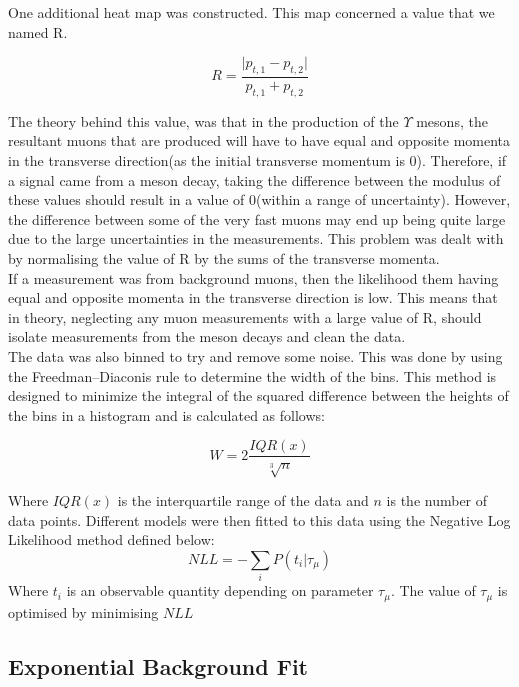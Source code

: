 \documentclass[A4sheet,12pt]{article}
\begin{document}
One additional heat map was constructed. This map concerned a value that we named R.

\begin{equation}
    R = \frac{\lvert p_{t, 1} - p_{t, 2}\rvert}{p_{t, 1} + p_{t, 2}}
\end{equation}

The theory behind this value, was that in the production of the $\Upsilon$ mesons, the resultant muons that are produced will have to have equal and opposite momenta in the transverse direction(as the initial transverse momentum is 0). Therefore, if a signal came from a meson decay, taking the difference between the modulus of these values should result in a value of 0(within a range of uncertainty). However, the difference between some of the very fast muons may end up being quite large due to the large uncertainties in the measurements. This problem was dealt with by normalising the value of R by the sums of the transverse momenta.\\

If a measurement was from background muons, then the likelihood them having equal and opposite momenta in the transverse direction is low. This means that in theory, neglecting any muon measurements with a large value of R, should isolate measurements from the meson decays and clean the data. \\

The data was also binned to try and remove some noise. This was done by using the Freedman–Diaconis rule to determine the width of the bins. This method is designed to minimize the integral of the squared difference between the heights of the bins in a histogram\cite{freedman} and is calculated as follows:

\begin{equation}
    W = 2\frac{IQR(x)}{\sqrt[3]{n}}
\end{equation}

Where $IQR(x)$ is the interquartile range of the data and $n$ is the number of data points. Different models were then fitted to this data using the Negative Log Likelihood method defined below:
\begin{equation}
    NLL = - \sum_{i} P(t_i|\tau_{\mu})
\end{equation}
Where $t_i$ is an observable quantity depending on parameter $\tau_{\mu}$. The value of $\tau_{\mu}$ is optimised by minimising $NLL$
\subsection*{Exponential Background Fit}
\end{document}
